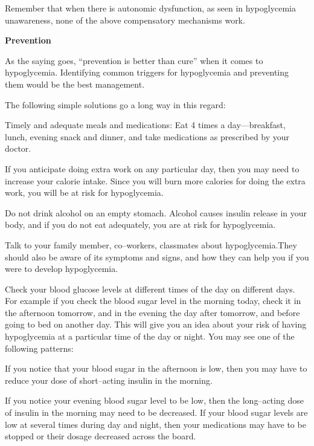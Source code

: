 Remember that when there is autonomic dysfunction, as seen in hypoglycemia unawareness, none of the above compensatory mechanisms work. 


\textbf{Prevention}

As the saying goes, “prevention is better than cure” when it comes to hypoglycemia. Identifying common triggers for hypoglycemia and preventing them would be the best management.

The following simple solutions go a long way in this regard:

\item Timely and adequate meals and medications: Eat 4 times a day—breakfast, lunch, evening snack and dinner, and take medications as prescribed by your doctor.

 \item If you anticipate doing extra work on any particular day, then you may need to increase your calorie intake. Since you will burn more calories for doing the extra work, you will be at risk for hypoglycemia.

 \item Do not drink alcohol on an empty stomach. Alcohol causes insulin release in your body, and if you do not eat adequately, you are at risk for hypoglycemia.

 \item Talk to your family member, co–workers, classmates about hypoglycemia.They should also be aware of its symptoms and signs, and how they can help you if you were to develop hypoglycemia.

 \item Check your blood glucose levels at different times of the day on different days. For example if you check the blood sugar level in the morning today, check it in the afternoon tomorrow, and in the evening the day after tomorrow, and before going to bed on another day. This will give you an idea about your risk of having hypoglycemia at a particular time of the day or night. You may see one of the following patterns:
 \item If you notice that your blood sugar in the afternoon is low, then you may have to reduce your dose of short–acting insulin in the morning.

 \item If you notice your evening blood sugar level to be low, then the long–acting dose of insulin in the morning may need to be decreased. If your blood sugar levels are low at several times during day and night, then your medications may have to be stopped or their dosage decreased across the board.



